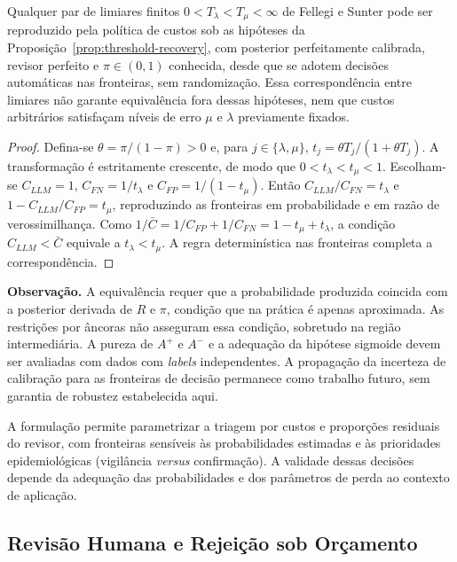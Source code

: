 \begin{corollary}
\label{cor:gz-degenerate}
\label{prop:fs-as-special-case}
Qualquer par de limiares finitos $0<T_\lambda<T_\mu<\infty$ de Fellegi e Sunter pode ser reproduzido pela política de custos sob as hipóteses da Proposição~\ref{prop:threshold-recovery}, com posterior perfeitamente calibrada, revisor perfeito e $\pi\in(0,1)$ conhecida, desde que se adotem decisões automáticas nas fronteiras, sem randomização. Essa correspondência entre limiares não garante equivalência fora dessas hipóteses, nem que custos arbitrários satisfaçam níveis de erro $\mu$ e $\lambda$ previamente fixados.
\end{corollary}

\begin{proof}
Defina-se $\theta=\pi/(1-\pi)>0$ e, para $j\in\{\lambda,\mu\}$, $t_j=\theta T_j/(1+\theta T_j)$. A transformação é estritamente crescente, de modo que $0<t_\lambda<t_\mu<1$. Escolham-se $C_{LLM}=1$, $C_{FN}=1/t_\lambda$ e $C_{FP}=1/(1-t_\mu)$. Então $C_{LLM}/C_{FN}=t_\lambda$ e $1-C_{LLM}/C_{FP}=t_\mu$, reproduzindo as fronteiras em probabilidade e em razão de verossimilhança. Como $1/\bar C=1/C_{FP}+1/C_{FN}=1-t_\mu+t_\lambda$, a condição $C_{LLM}<\bar C$ equivale a $t_\lambda<t_\mu$. A regra determinística nas fronteiras completa a correspondência.
\end{proof}

\textbf{Observação.} A equivalência requer que a probabilidade produzida coincida com a posterior derivada de $R$ e $\pi$, condição que na prática é apenas aproximada. As restrições por âncoras não asseguram essa condição, sobretudo na região intermediária. A pureza de $A^+$ e $A^-$ e a adequação da hipótese sigmoide devem ser avaliadas com dados com \textit{labels} independentes. A propagação da incerteza de calibração para as fronteiras de decisão permanece como trabalho futuro, sem garantia de robustez estabelecida aqui.

A formulação permite parametrizar a triagem por custos e proporções residuais do revisor, com fronteiras sensíveis às probabilidades estimadas e às prioridades epidemiológicas (vigilância \textit{versus} confirmação). A validade dessas decisões depende da adequação das probabilidades e dos parâmetros de perda ao contexto de aplicação.

\subsection{Revisão Humana e Rejeição sob Orçamento}

